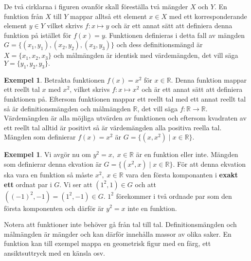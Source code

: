 \documentclass{article}
\theoremstyle{definition}
\newtheorem{exmp}[thm]{Exempel}
\begin{document}
De två cirklarna i figuren ovanför skall föreställa två mängder $X$ och $Y$. En funktion 
från $X$ till $Y$ mappar alltså ett element $x \in X$ med ett korresponderande element $y \in Y$
vilket skrivs $f: x \mapsto y$ och är ett annat sätt att definiera denna funktion på istället för $f(x) = y$.
Funktionen definieras i detta fall av mängden $G = \{ (x_1, y_1), (x_2, y_2), (x_3, y_3) \}$ och dess 
definitionsmängd är $X = \{ x_1, x_2, x_3\}$ och målmängden är identisk med värdemängden, det vill säga $Y = \{ y_1, y_2, y_3\}.$ 

\begin{exmp}
  Betrakta funktionen $f(x) = x^2$ för $x \in \mathbb{R}$. Denna funktion mappar 
  ett reellt tal $x$ med $x^2$, vilket skrivs 
  $f: x \mapsto x^2$
  och är ett annat sätt att definiera funktionen på.
  Eftersom funktionen mappar ett reellt tal med ett annat reellt tal så är definitionsmängden
  och målmängden $\mathbb{R}$, det vill säga 
  $f: \mathbb{R} \rightarrow \mathbb{R}.$
  Värdemängden är alla möjliga utvärden av funktionen och eftersom kvadraten av ett reellt tal alltid 
  är positivt så är värdemängden alla positiva reella tal. 
  Mängden som definierar $f(x) = x^2$ är
  $G = \{ (x, x^2) \; | \; x \in \mathbb{R}\}.$  
\end{exmp}

\begin{exmp}
  Vi avgör nu om $y^2 = x, \; x \in \mathbb{R}$ är en funktion eller inte. 
  Mängden 
  som definierar denna ekvation är $G = \{ (x^2, x) \; | \; x \in \mathbb{R} \}.$
  För att denna ekvation ska vara en funktion
  så måste $x^2, \; x \in \mathbb{R}$ vara den första komponanten i \textbf{exakt ett} ordnat par i $G$.
  Vi ser att $(1^2, 1) \in G$ och att $((-1)^2, -1) = (1^2, -1) \in G$. 
  $1^2$ förekommer i två ordnade par som den första komponenten och därför är 
  $y^2 = x$ inte en funktion.  
\end{exmp}

Notera att funktioner inte behöver gå från tal till tal. Definitionsmängden och målmängden är 
mängder och kan därför innehålla massor av olika saker. En funktion kan till exempel 
mappa en geometrisk figur med en färg, ett ansiktsuttryck med en känsla osv. 
\end{document}
